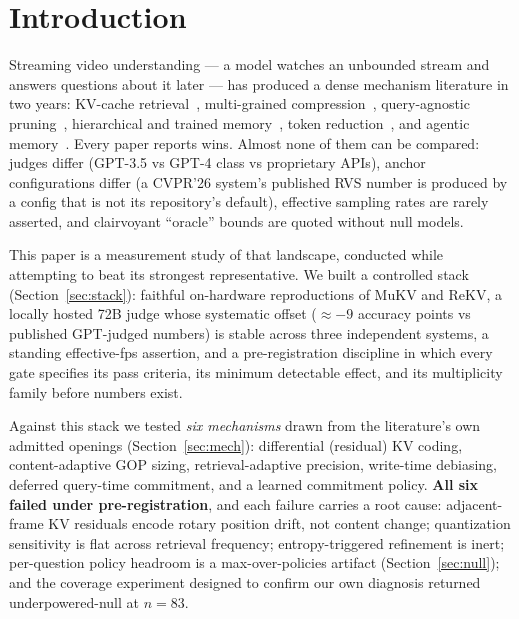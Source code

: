 \section{Introduction}
\label{sec:intro}

Streaming video understanding — a model watches an unbounded stream and answers questions about it later — has produced a dense mechanism literature in two years: KV-cache retrieval~\cite{rekv}, multi-grained compression~\cite{mukv}, query-agnostic pruning~\cite{streammem,infiniPotV,streamingtom}, hierarchical and trained memory~\cite{hermes,weavetime,streamingvlm}, token reduction~\cite{codecsight,eventvstream,statekv,polykv,streamkv}, and agentic memory~\cite{avas,worldmm}. Every paper reports wins. Almost none of them can be compared: judges differ (GPT-3.5 vs GPT-4 class vs proprietary APIs), anchor configurations differ (a CVPR'26 system's published RVS number is produced by a config that is not its repository's default), effective sampling rates are rarely asserted, and clairvoyant ``oracle'' bounds are quoted without null models.

This paper is a measurement study of that landscape, conducted while attempting to beat its strongest representative. We built a controlled stack (Section~\ref{sec:stack}): faithful on-hardware reproductions of MuKV and ReKV, a locally hosted 72B judge whose systematic offset ($\approx -9$ accuracy points vs published GPT-judged numbers) is stable across three independent systems, a standing effective-fps assertion, and a pre-registration discipline in which every gate specifies its pass criteria, its minimum detectable effect, and its multiplicity family before numbers exist.

Against this stack we tested \emph{six mechanisms} drawn from the literature's own admitted openings (Section~\ref{sec:mech}): differential (residual) KV coding, content-adaptive GOP sizing, retrieval-adaptive precision, write-time debiasing, deferred query-time commitment, and a learned commitment policy. \textbf{All six failed under pre-registration}, and each failure carries a root cause: adjacent-frame KV residuals encode rotary position drift, not content change; quantization sensitivity is flat across retrieval frequency; entropy-triggered refinement is inert; per-question policy headroom is a max-over-policies artifact (Section~\ref{sec:null}); and the coverage experiment designed to confirm our own diagnosis returned underpowered-null at $n{=}83$.

